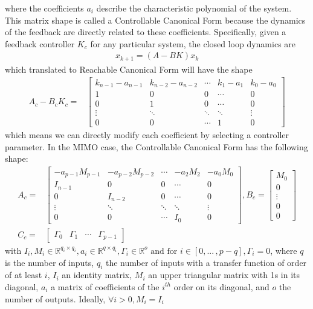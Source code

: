 \documentclass[sigconf]{llncs}
\newcommand{\mat}[1]{{#1}}
\renewcommand{\vec}[1]{{#1}}
\begin{document}
where the coefficients $a_i$ describe the characteristic polynomial of the system. This matrix shape is
called a Controllable Canonical Form because the dynamics of the feedback are directly related to these
coefficients. Specifically, given a feedback controller $\mat{K}_c$ for any particular system, the closed loop dynamics
are
\begin{align}
\vec{x}_{k+1}=(\mat{A}-\mat{B}\mat{K})\vec{x}_k
\label{eq:closeloopdynamics}
\end{align}
which translated to Reachable Canonical Form will have the shape
\begin{align}
\mat{A}_c-\mat{B}_c\mat{K}_c=&\left[
\begin{array}{ccccc}
k_{n-1}-a_{n-1}&k_{n-2}-a_{n-2}&\cdots&k_1-a_1&k_0-a_0\\
1&0&0&\cdots&0\\
0&1&0&\cdots&0\\
\vdots&\ddots&\ddots&\ddots&\vdots\\
0&0&\cdots&1&0
\end{array}\right]
\label{eq:cf_SISO_fb}
\end{align}
which means we can directly modify each coefficient by selecting a controller parameter.
In the MIMO case, the Controllable Canonical Form has the following shape:
\begin{align}
\mat{A}_c=&\left[
\begin{array}{ccccc}
-\mat{a}_{p-1}\mat{M}_{p-1}&-\mat{a}_{p-2}\mat{M}_{p-2}&\cdots&-\mat{a}_{2}\mat{M}_{2}&-\mat{a}_0\mat{M}_0\\
\mat{I}_{n-1}&0&0&\cdots&0\\
0&\mat{I}_{n-2}&0&\cdots&0\\
\vdots&\ddots&\ddots&\ddots&\vdots\\
0&0&\cdots&\mat{I}_0&0
\end{array}\right],
\mat{B}_c=\left[
\begin{array}{c}
\mat{M}_0\\0\\ \vdots\\ 0\\ 0
\end{array}\right]\nonumber\\
\mat{C}_c=&[\begin{array}{ccccc}\mat{\Gamma}_{0}&\mat{\Gamma}_{1}&\cdots&\mat{\Gamma}_{p-1}\end{array}] 
\label{eq:cf_MIMO}
\end{align}
with $\mat{I}_i,\mat{M}_i \in \mathbb{R}^{q_i \times q_i}, \mat{a}_i \in \mathbb{R}^{q \times q_i}, \mat{\Gamma}_i \in \mathbb{R}^o \text{ and for }  i \in [0, ...\,,p-q], \mat{\Gamma}_{i}=0$, where $q$ is the number of inputs, $q_i$ the number of inputs with a transfer function of order of at least $i$, $\mat{I}_i$ an identity matrix, $\mat{M}_i$ an upper triangular matrix with 1s in its diagonal, $\mat{a_i}$ a matrix of coefficients of the $i^{th}$ order on its diagonal, and $o$ the number of outputs. Ideally, $\forall i>0, \mat{M}_i=\mat{I}_i$
\end{document}
